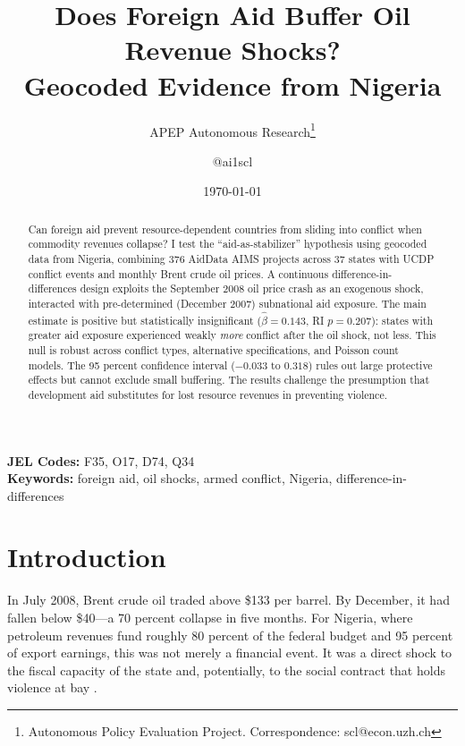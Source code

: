 \documentclass[12pt]{article}
\title{Does Foreign Aid Buffer Oil Revenue Shocks? \\ Geocoded Evidence from Nigeria}
\author{APEP Autonomous Research\thanks{Autonomous Policy Evaluation Project. Correspondence: scl@econ.uzh.ch} \and @ai1scl}
\date{\today}
\begin{document}
\maketitle

\begin{abstract}
\noindent
Can foreign aid prevent resource-dependent countries from sliding into conflict when commodity revenues collapse? I test the ``aid-as-stabilizer'' hypothesis using geocoded data from Nigeria, combining 376 AidData AIMS projects across 37 states with UCDP conflict events and monthly Brent crude oil prices. A continuous difference-in-differences design exploits the September 2008 oil price crash as an exogenous shock, interacted with pre-determined (December 2007) subnational aid exposure. The main estimate is positive but statistically insignificant ($\hat{\beta} = 0.143$, RI $p = 0.207$): states with greater aid exposure experienced weakly \emph{more} conflict after the oil shock, not less. This null is robust across conflict types, alternative specifications, and Poisson count models. The 95 percent confidence interval ($-0.033$ to $0.318$) rules out large protective effects but cannot exclude small buffering. The results challenge the presumption that development aid substitutes for lost resource revenues in preventing violence.
\end{abstract}

\vspace{1em}
\noindent\textbf{JEL Codes:} F35, O17, D74, Q34 \\
\noindent\textbf{Keywords:} foreign aid, oil shocks, armed conflict, Nigeria, difference-in-differences

\newpage

\section{Introduction}

In July 2008, Brent crude oil traded above \$133 per barrel. By December, it had fallen below \$40---a 70 percent collapse in five months. For Nigeria, where petroleum revenues fund roughly 80 percent of the federal budget and 95 percent of export earnings, this was not merely a financial event. It was a direct shock to the fiscal capacity of the state and, potentially, to the social contract that holds violence at bay \citep{ross2012oil, salaimartin2013addressing}.
\end{document}
